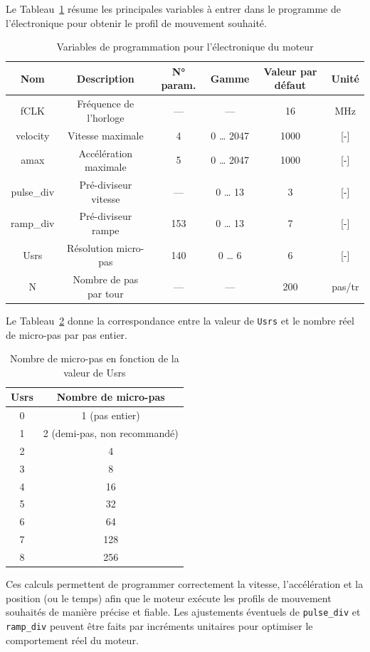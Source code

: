 Le Tableau~\ref{tab:variables_prog} résume les principales variables à entrer dans le programme de l’électronique pour obtenir le profil de mouvement souhaité.

\begin{table}[h]
\centering
\renewcommand{\arraystretch}{1.3}
\begin{tabular}{|c|c|c|c|c|c|}
\hline
Nom & Description & N° param. & Gamme & Valeur par défaut & Unité \\
\hline
fCLK & Fréquence de l’horloge & --- & --- & 16 & MHz \\
velocity & Vitesse maximale & 4 & 0 … 2047 & 1000 & [-] \\
amax & Accélération maximale & 5 & 0 … 2047 & 1000 & [-] \\
pulse\_div & Pré-diviseur vitesse & --- & 0 … 13 & 3 & [-] \\
ramp\_div & Pré-diviseur rampe & 153 & 0 … 13 & 7 & [-] \\
Usrs & Résolution micro-pas & 140 & 0 … 6 & 6 & [-] \\
N & Nombre de pas par tour & --- & --- & 200 & pas/tr \\
\hline
\end{tabular}
\caption{Variables de programmation pour l’électronique du moteur}
\label{tab:variables_prog}
\end{table}

Le Tableau~\ref{tab:Usrs} donne la correspondance entre la valeur de \texttt{Usrs} et le nombre réel de micro-pas par pas entier.

\begin{table}[h]
\centering
\renewcommand{\arraystretch}{1.3}
\begin{tabular}{|c|c|}
\hline
Usrs & Nombre de micro-pas \\
\hline
0 & 1 (pas entier) \\
1 & 2 (demi-pas, non recommandé) \\
2 & 4 \\
3 & 8 \\
4 & 16 \\
5 & 32 \\
6 & 64 \\
7 & 128 \\
8 & 256 \\
\hline
\end{tabular}
\caption{Nombre de micro-pas en fonction de la valeur de Usrs}
\label{tab:Usrs}
\end{table}

Ces calculs permettent de programmer correctement la vitesse, l’accélération et la position (ou le temps) afin que le moteur exécute les profils de mouvement souhaités de manière précise et fiable. Les ajustements éventuels de \texttt{pulse\_div} et \texttt{ramp\_div} peuvent être faits par incréments unitaires pour optimiser le comportement réel du moteur.

